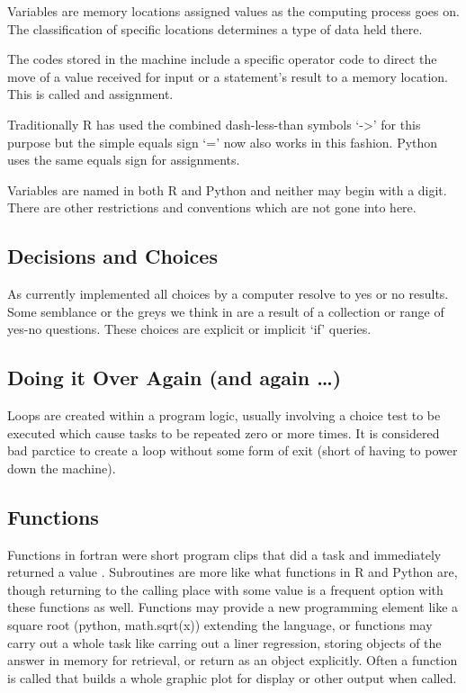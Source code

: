 \documentclass[]{book}
\theoremstyle{definition}
\theoremstyle{definition}
\theoremstyle{definition}
\theoremstyle{remark}
\begin{document}
Variables are memory locations assigned values as the computing process
goes on. The classification of specific locations determines a type of
data held there.

The codes stored in the machine include a specific operator code to
direct the move of a value received for input or a statement's result to
a memory location. This is called and assignment.

Traditionally R has used the combined dash-less-than symbols
`-\textgreater{}' for this purpose but the simple equals sign `=' now
also works in this fashion. Python uses the same equals sign for
assignments.

Variables are named in both R and Python and neither may begin with a
digit. There are other restrictions and conventions which are not gone
into here.

\subsection{\texorpdfstring{Decisions and Choices 
 
}{Decisions and Choices    }}\label{decisions-and-choices}

As currently implemented all choices by a computer resolve to yes or no
results. Some semblance or the greys we think in are a result of a
collection or range of yes-no questions. These choices are explicit or
implicit `if' queries.

\subsection{\texorpdfstring{Doing it Over Again (and again \ldots{})
}{Doing it Over Again (and again \ldots{}) }}\label{doing-it-over-again-and-again}

Loops are created within a program logic, usually involving a choice
test to be executed which cause tasks to be repeated zero or more times.
It is considered bad parctice to create a loop without some form of exit
(short of having to power down the machine).

\subsection{\texorpdfstring{Functions
}{Functions }}\label{functions}

Functions in fortran were short program clips that did a task and
immediately returned a value . Subroutines are more like what functions
in R and Python are, though returning to the calling place with some
value is a frequent option with these functions as well. Functions may
provide a new programming element like a square root (python,
math.sqrt(x)) extending the language, or functions may carry out a whole
task like carring out a liner regression, storing objects of the answer
in memory for retrieval, or return as an object explicitly. Often a
function is called that builds a whole graphic plot for display or other
output when called.
\end{document}
